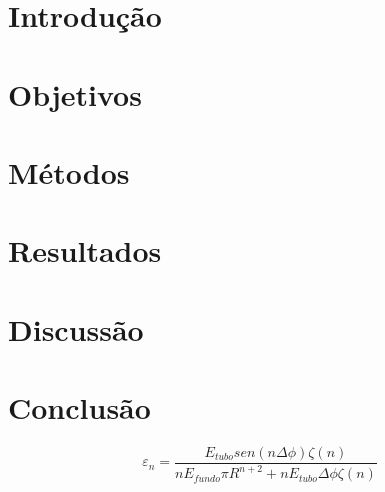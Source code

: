 \documentclass[a4paper,12pt]{article}
\begin{document}
\title{}

\author{Aluno: Rafael M. Miller NUSP.: 7581818}

\maketitle

\section{Introdução}

\section{Objetivos}

\section{Métodos}

\section{Resultados}

\section{Discussão}

\section{Conclusão}




\begin{equation}
\varepsilon_n = \frac{E_{tubo} sen(n \Delta \phi) \zeta(n)}{n E_{fundo} \pi R^{n+2} + n  E_{tubo} \Delta \phi \zeta(n)}
\label{eq:analitical_epsilon_n}
\end{equation}
\end{document}
